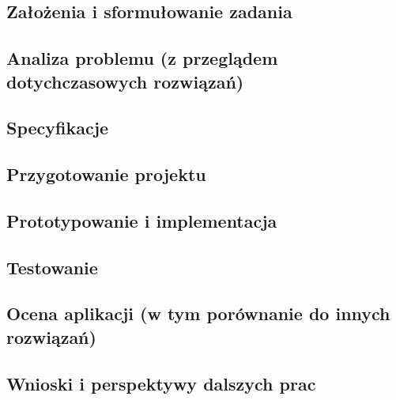 \subsection{Założenia i sformułowanie zadania}  

\subsection{Analiza problemu (z przeglądem dotychczasowych rozwiązań)}

\subsection{Specyfikacje}

\subsection{Przygotowanie projektu}

\subsection{Prototypowanie i implementacja}

\subsection{Testowanie}

\subsection{Ocena aplikacji (w tym porównanie do innych rozwiązań)}

\subsection{Wnioski i perspektywy dalszych prac}